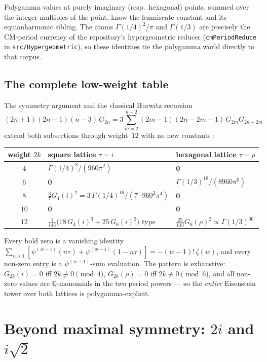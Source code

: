 Polygamma values at purely imaginary (resp.\ hexagonal) points, summed over the integer
multiples of the point, know the lemniscate constant and its equianharmonic sibling. The
atoms $\Gamma(1/4)^2/\pi$ and $\Gamma(1/3)$ are precisely the CM-period currency of the
repository's hypergeometric reducer (\texttt{cmPeriodReduce} in \texttt{src/Hypergeometric}),
so these identities tie the polygamma world directly to that corpus.

\subsection{The complete low-weight table}

The symmetry argument and the classical Hurwitz recursion \cite{cm:Hurwitz}
\[
(2n+1)(2n-1)(n-3)\,G_{2n}=3\sum_{m=2}^{n-2}(2m-1)(2n-2m-1)\,G_{2m}G_{2n-2m}
\]
extend both subsections through weight~$12$ with no new constants
:

\begin{center}
\begin{tabular}{c l l}
\toprule
weight $2k$ & square lattice $\tau=i$ & hexagonal lattice $\tau=\rho$\\
\midrule
$4$ & $\Gamma(1/4)^8/(960\pi^2)$ & $\mathbf{0}$\\
$6$ & $\mathbf{0}$ & $\Gamma(1/3)^{18}/(8960\pi^6)$\\
$8$ & $\tfrac37 G_4(i)^2=3\,\Gamma(1/4)^{16}/(7\cdot 960^2\pi^4)$ & $\mathbf{0}$\\
$10$ & $\mathbf{0}$ & $\mathbf{0}$\\
$12$ & $\tfrac{1}{143}\bigl(18\,G_4(i)^3+25\,G_6(i)^2\bigr)$ type
     & $\tfrac{25}{143}G_6(\rho)^2\propto\Gamma(1/3)^{36}$\\
\bottomrule
\end{tabular}
\end{center}

Every bold zero is a vanishing identity
$\sum_{n\ge1}[\psi^{(w-1)}(n\tau)+\psi^{(w-1)}(1-n\tau)]=-(w-1)!\,\zeta(w)$, and every
non-zero entry is a $\psi^{(w-1)}$-sum evaluation. The pattern is exhaustive: $G_{2k}(i)=0$
iff $2k\not\equiv 0\pmod 4$, $G_{2k}(\rho)=0$ iff $2k\not\equiv 0\pmod 6$, and all non-zero
values are $\mathbb{Q}$-monomials in the two period powers --- so the \emph{entire} Eisenstein
tower over both lattices is polygamma-explicit.

\section{Beyond maximal symmetry: \texorpdfstring{$2i$ and $i\sqrt2$}{2i and i sqrt(2)}}
\label{cm:sec:nextpoints}

